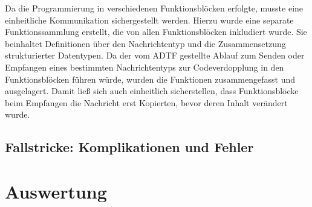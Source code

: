\documentclass[12pt, a4paper]{scrartcl}
\begin{document}
Da die Programmierung in verschiedenen Funktionsblöcken erfolgte, musste eine einheitliche Kommunikation sichergestellt werden. Hierzu wurde eine separate Funktionssammlung erstellt, die von allen Funktionsblöcken inkludiert wurde. Sie beinhaltet Definitionen über den Nachrichtentyp und die Zusammensetzung strukturierter Datentypen. Da der vom ADTF gestellte Ablauf zum Senden oder Empfangen eines bestimmten Nachrichtentyps zur Codeverdopplung in den Funktionsblöcken führen würde, wurden die Funktionen zusammengefasst und ausgelagert. Damit ließ sich auch einheitlich sicherstellen, dass Funktionsblöcke beim Empfangen die Nachricht erst Kopierten, bevor deren Inhalt verändert wurde.

\subsection{Fallstricke: Komplikationen und Fehler}


\newpage
\section{Auswertung}

\newpage
{}
\listoffigures
\end{document}
